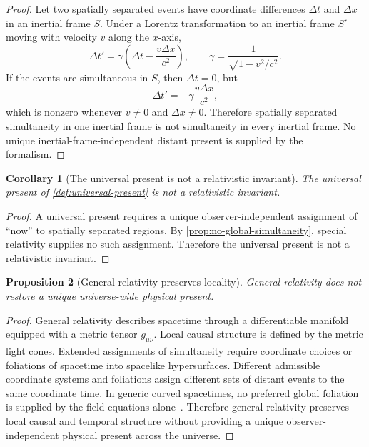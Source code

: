 \documentclass[12pt,onecolumn]{article}
\newtheorem{proposition}{Proposition}[section]
\newtheorem{corollary}[proposition]{Corollary}
\begin{document}
\begin{proof}
Let two spatially separated events have coordinate differences \(\Delta t\) and \(\Delta x\) in an inertial frame \(S\). Under a Lorentz transformation to an inertial frame \(S'\) moving with velocity \(v\) along the \(x\)-axis,
\begin{equation}
\Delta t'=\gamma\left(\Delta t-\frac{v\Delta x}{c^2}\right),
\qquad
\gamma=\frac{1}{\sqrt{1-v^2/c^2}}.
\end{equation}
If the events are simultaneous in \(S\), then \(\Delta t=0\), but
\begin{equation}
\Delta t'=-\gamma\frac{v\Delta x}{c^2},
\end{equation}
which is nonzero whenever \(v\neq 0\) and \(\Delta x\neq 0\). Therefore spatially separated simultaneity in one inertial frame is not simultaneity in every inertial frame. No unique inertial-frame-independent distant present is supplied by the formalism.
\end{proof}

\begin{corollary}[The universal present is not a relativistic invariant]
\label{cor:not-invariant}
The universal present of \cref{def:universal-present} is not a relativistic invariant.
\end{corollary}

\begin{proof}
A universal present requires a unique observer-independent assignment of ``now'' to spatially separated regions. By \cref{prop:no-global-simultaneity}, special relativity supplies no such assignment. Therefore the universal present is not a relativistic invariant.
\end{proof}

\begin{proposition}[General relativity preserves locality]
\label{prop:gr-locality}
General relativity does not restore a unique universe-wide physical present.
\end{proposition}

\begin{proof}
General relativity describes spacetime through a differentiable manifold equipped with a metric tensor \(g_{\mu\nu}\). Local causal structure is defined by the metric light cones. Extended assignments of simultaneity require coordinate choices or foliations of spacetime into spacelike hypersurfaces. Different admissible coordinate systems and foliations assign different sets of distant events to the same coordinate time. In generic curved spacetimes, no preferred global foliation is supplied by the field equations alone~\cite{Wald1984,Malament2012}. Therefore general relativity preserves local causal and temporal structure without providing a unique observer-independent physical present across the universe.
\end{proof}
\end{document}
